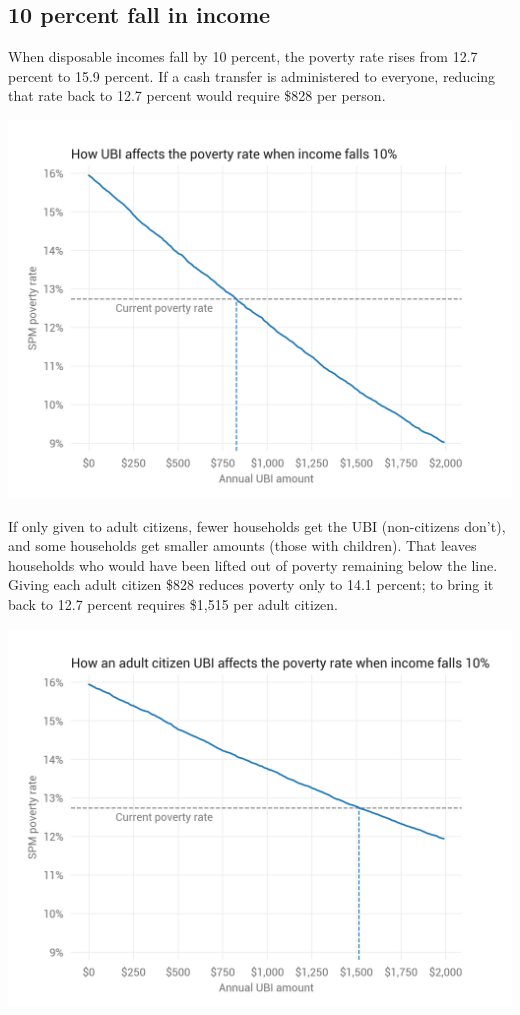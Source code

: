 \documentclass[12pt]{article}
\begin{document}
\subsection{10 percent fall in income} \label{sec:10pctfall}

When disposable incomes fall by 10 percent, the poverty rate rises from 12.7 percent to 15.9 percent. If a cash transfer is administered to everyone, reducing that rate back to 12.7 percent would require \$828 per person.

\begin{center}
\includegraphics[width=15cm]{pov_rate_by_ubi_10pct_all.png}
\label{fig:pov_rate_by_ubi_10pct_all}
\end{center}

If only given to adult citizens, fewer households get the UBI (non-citizens don't), and some households get smaller amounts (those with children). That leaves households who would have been lifted out of poverty remaining below the line. Giving each adult citizen \$828 reduces poverty only to 14.1 percent; to bring it back to 12.7 percent requires \$1,515 per adult citizen.

\begin{center}
\includegraphics[width=15cm]{pov_rate_by_ubi_10pct_adult_citizens.png}
\label{fig:pov_rate_by_ubi_10pct_adult_citizens}
\end{center}
\end{document}
